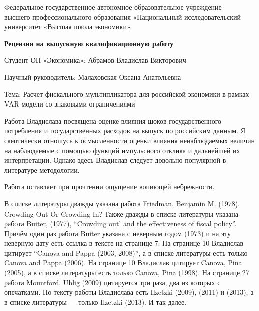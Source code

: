 \documentclass[a4paper, 12pt]{article}
\begin{document}
\begin{center}
{\small Федеральное государственное автономное образовательное учреждение\\ 
высшего профессионального образования «Национальный исследовательский\\ 
университет «Высшая школа экономики».}
\end{center}

\vspace{0.4cm}

\begin{center}
\textbf{Рецензия на выпускную квалификационную работу}
\end{center}

\vspace{0.4cm}

Студент ОП «Экономика»: Абрамов Владислав Викторович

\vspace{0.4cm}

Научный руководитель: Малаховская Оксана Анатольевна

\vspace{0.4cm}

Тема: Расчет фискального мультипликатора для российской экономики в рамках
VAR-модели со знаковыми ограничениями

\vspace{0.4cm}

Работа Владислава посвящена оценке влияния шоков государственного
потребления и государственных расходов на выпуск по российским данным. Я
скептически отношусь к осмысленности оценки влияния ненаблюдаемых
величин на наблюдаемые с помощью функций импульсного отклика и
дальнейшей их интерпретации. Однако здесь Владислав следует довольно
популярной в литературе методологии.

Работа оставляет при прочтении ощущение вопиющей небрежности.

В списке литературы дважды указана работа Friedman, Benjamin M. (1978),
Crowding Out Or Crowding In? Также дважды в списке литературы указана
работа Buiter, (1977), ``Crowding out' and the effectiveness of fiscal
policy''. Причём один раз работа Buiter указана с неверным годом (1973)
и на эту неверную дату есть ссылка в тексте на странице 7. На странице
10 Владислав цитирует ``Canova and Pappa (2003, 2008)'', а в списке
литературы есть только Canova and Pappa (2006). На странице 10 Владислав
цитирует Canova, Pina (2005), а в списке литературы есть только Canova,
Pina (1998). На странице 27 работа Mountford, Uhlig (2009) цитируется
три раза, два из которых с опечатками. По тексту работы Владислава есть
Ilzetzki (2009), (2011) и (2013), а в списке литературы --- только
Ilzetzki (2013). И так далее.
\end{document}

